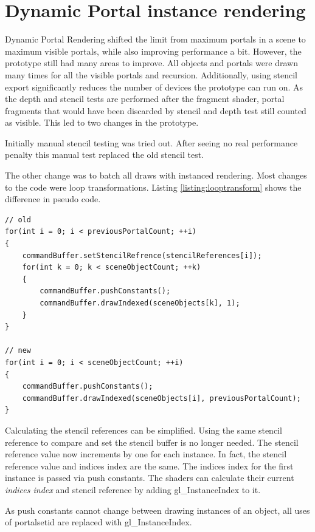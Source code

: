 \section{Dynamic Portal instance rendering}
\label{section:dynamicportalinstancerendering}
Dynamic Portal Rendering shifted the limit from maximum portals in a scene to maximum visible portals, while also improving performance a bit. However, the prototype still had many areas to improve. All objects and portals were drawn many times for all the visible portals and recursion. Additionally, using stencil export significantly reduces the number of devices the prototype can run on. As the depth and stencil tests are performed after the fragment shader, portal fragments that would have been discarded by stencil and depth test still counted as visible. This led to two changes in the prototype.

Initially manual stencil testing was tried out. After seeing no real performance penalty this manual test replaced the old stencil test.

The other change was to batch all draws with instanced rendering. Most changes to the code were loop transformations. Listing \ref{listing:looptransform} shows the difference in pseudo code.

\begin{lstlisting}[caption={Pseudocode Loop Transformation}, label=listing:looptransform]
// old 
for(int i = 0; i < previousPortalCount; ++i)
{
	commandBuffer.setStencilRefrence(stencilReferences[i]);
	for(int k = 0; k < sceneObjectCount; ++k)
	{
		commandBuffer.pushConstants();
		commandBuffer.drawIndexed(sceneObjects[k], 1);
	}
}

// new
for(int i = 0; i < sceneObjectCount; ++i)
{
	commandBuffer.pushConstants();
	commandBuffer.drawIndexed(sceneObjects[i], previousPortalCount);
}
\end{lstlisting}


Calculating the stencil references can be simplified. Using the same stencil reference to compare and set the stencil buffer is no longer needed. The stencil reference value now increments by one for each instance. In fact, the stencil reference value and indices index are the same. The indices index for the first instance is passed via push constants. The shaders can calculate their current \textit{indices index} and stencil reference by adding gl\_InstanceIndex to it.

As push constants cannot change between drawing  instances of an object, all uses of \gls{portalsetid} are replaced with gl\_InstanceIndex.

